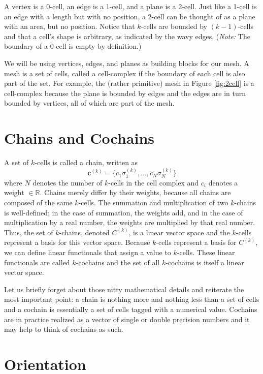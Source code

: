 A vertex is a 0-cell, an edge is a 1-cell, and a plane is a 2-cell. Just like a 1-cell is an edge with a length but with no position, a 2-cell can be thought of as a plane with an area, but no position. Notice that $k$-cells are bounded by $(k-1)$-cells and that a cell's shape is arbitrary, as indicated by the wavy edges. (\textit{Note:} The boundary of a 0-cell is empty by definition.)

We will be using vertices, edges, and planes as building blocks for our mesh. A mesh is a set of cells, called a cell-complex if the boundary of each cell is also part of the set. For example, the (rather primitive) mesh in Figure \ref{fig:2cell} is a cell-complex because the plane is bounded by edges and the edges are in turn bounded by vertices, all of which are part of the mesh.

\section{Chains and Cochains}

A set of $k$-cells is called a chain, written as
\begin{equation}
    \mathbf{c}^{(k)} = \{c_1 \sigma^{(k)}_1, \ldots, c_N \sigma^{(k)}_N \}
\end{equation}
where $N$ denotes the number of $k$-cells in the cell complex and $c_i$ denotes a weight $\in \mathbb{R}$. Chains merely differ by their weights, because all chains are composed of the same $k$-cells. The summation and multiplication of two $k$-chains is well-defined; in the case of summation, the weights add, and in the case of multiplication by a real number, the weights are multiplied by that real number. Thus, the set of $k$-chains, denoted $C^{(k)}$, is a linear vector space and the $k$-cells represent a basis for this vector space. Because $k$-cells represent a basis for $C^{(k)}$, we can define linear functionals that assign a value to $k$-cells. These linear functionals are called $k$-cochains and the set of all $k$-cochains is itself a linear vector space.

Let us briefly forget about those nitty mathematical details and reiterate the most important point: a chain is nothing more and nothing less than a set of cells and a cochain is essentially a set of cells tagged with a numerical value. Cochains are in practice realized as a vector of single or double precision numbers and it may help to think of cochains as such.

\section{Orientation}

